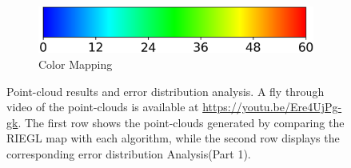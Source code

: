 \documentclass[english, bachelor, utf8]{base/thesis_telematics}
\begin{document}
\begin{figure}
\begin{subfigure}{0.3\textwidth}
    \centering
    \includegraphics[width=\textwidth]{pics/histogram_results/hsv.png}
    \caption{Color Mapping}
    \label{fig:hsv}
\end{subfigure}
\caption{Point-cloud results and error distribution analysis. A fly through video of the point-clouds is available at \url{https://youtu.be/Ere4UjPg-gk}. 
The first row shows the point-clouds generated by comparing the RIEGL map with each algorithm, while the second row displays the corresponding error distribution Analysis(Part 1).}
\label{fig:combined_results1}
\end{figure}
\end{document}

